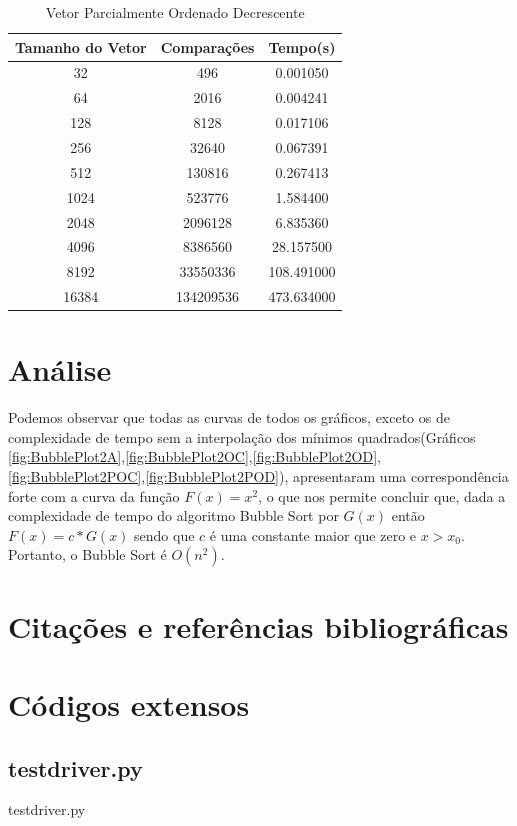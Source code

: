 \documentclass[12pt,a4paper,twoside]{report}
\begin{document}
\begin{table}[h]
  \centering
  \caption{Vetor Parcialmente Ordenado Decrescente \label{tab:pod}}
  \begin{tabular}{ccc} \\\hline
  \textbf{Tamanho do Vetor} & \textbf{Comparações} & \textbf{Tempo(s)} \\\hline
  32                        & 496                  & 0.001050          \\\hline
  64                        & 2016                 & 0.004241          \\\hline
  128                       & 8128                 & 0.017106          \\\hline
  256                       & 32640                & 0.067391          \\\hline
  512                       & 130816               & 0.267413          \\\hline
  1024                      & 523776               & 1.584400          \\\hline
  2048                      & 2096128              & 6.835360          \\\hline
  4096                      & 8386560              & 28.157500         \\\hline
  8192                      & 33550336             & 108.491000        \\\hline
  16384                     & 134209536            & 473.634000        \\\hline
  \end{tabular}
\end{table}


\chapter{Análise}

Podemos observar que todas as curvas de todos os gráficos, exceto os de complexidade de tempo sem a interpolação dos mínimos quadrados(Gráficos \ref{fig:BubblePlot2A},\ref{fig:BubblePlot2OC},\ref{fig:BubblePlot2OD},\ref{fig:BubblePlot2POC},\ref{fig:BubblePlot2POD}), apresentaram uma correspondência forte com a curva da função $F(x) = x^2$, o que nos permite concluir que, dada a complexidade de tempo do algoritmo Bubble Sort por $G(x)$ então $F(x) = c * G(x)$ sendo que $c$ é uma constante maior que zero e $x > x_0$. Portanto, o Bubble Sort é $O(n^2)$.

\chapter{Citações e referências bibliográficas}








\clearpage
{}
\appendix

\chapter{Códigos extensos \label{ap:testdriver}}
\section{testdriver.py}
 {testdriver.py}
\end{document}
